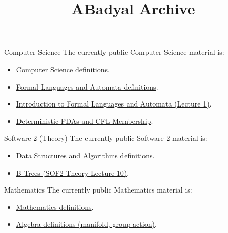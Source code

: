 \documentclass[hidelinks]{article}
\title{ABadyal Archive}
\author{}
\date{}
\begin{document}
\maketitle

\begin{sfragment}{Computer Science}
The currently public Computer Science material is:
\begin{itemize}
    \item \href{/:sTeX/browser?archive=ABadyal\&filepath=ComputerScience/ComputerScience_defs.xhtml}{Computer Science definitions}.
    \item \href{/:sTeX/browser?archive=ABadyal\&filepath=ComputerScience/FormalLanguagesAndAutomata/FormalLanguagesAndAutomata_defs.xhtml}{Formal Languages and Automata definitions}.
    \item \href{/:sTeX/browser?archive=ABadyal\&filepath=ComputerScience/FormalLanguagesAndAutomata/IntroductionToFormalLanguagesAndAutomata.xhtml}{Introduction to Formal Languages and Automata (Lecture 1)}.
    \item \href{/:sTeX/browser?archive=ABadyal\&filepath=ComputerScience/FormalLanguagesAndAutomata/DeterministicPDAsAndCFLMembership.xhtml}{Deterministic PDAs and CFL Membership}.
\end{itemize}
\end{sfragment}

\begin{sfragment}{Software 2 (Theory)}
The currently public Software 2 material is:
\begin{itemize}
    \item \href{/:sTeX/browser?archive=ABadyal\&filepath=ComputerScience/DataStructuresAndAlgorithms/DataStructuresAndAlgorithms_defs.xhtml}{Data Structures and Algorithms definitions}.
    \item \href{/:sTeX/browser?archive=ABadyal\&filepath=ComputerScience/DataStructuresAndAlgorithms/BTrees.xhtml}{B-Trees (SOF2 Theory Lecture 10)}.
\end{itemize}
\end{sfragment}

\begin{sfragment}{Mathematics}
The currently public Mathematics material is:
\begin{itemize}
    \item \href{/:sTeX/browser?archive=ABadyal\&filepath=Mathematics/Mathematics_defs.xhtml}{Mathematics definitions}.
    \item \href{/:sTeX/browser?archive=ABadyal\&filepath=Mathematics/Algebra/Algebra_defs.xhtml}{Algebra definitions (manifold, group action)}.
\end{itemize}
\end{sfragment}
\end{document}
